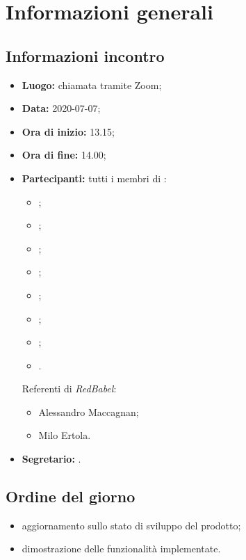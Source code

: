 \section{Informazioni generali}
\subsection{Informazioni incontro}
\begin{itemize}
	\item \textbf{Luogo:} chiamata tramite Zoom;
	\item \textbf{Data:} 2020-07-07;
	\item \textbf{Ora di inizio:} 13.15;
	\item \textbf{Ora di fine:} 14.00;
	\item \textbf{Partecipanti:}
		tutti i membri di \Gruppo:
		\begin{itemize}
			\item \VB;
			\item \LB;
			\item \NF;
			\item \EG;
			\item \FJ;
			\item \MP;
			\item \AS;
			\item \AZ.
		\end{itemize}
		
		Referenti di \textit{RedBabel}:
		\begin{itemize}
			\item Alessandro Maccagnan;
			\item Milo Ertola.
		\end{itemize}
	\item \textbf{Segretario:} \EG.
\end{itemize}

\subsection{Ordine del giorno}
\begin{itemize}
	\item aggiornamento sullo stato di sviluppo del prodotto; 
	\item dimostrazione delle funzionalità implementate. 
\end{itemize}
